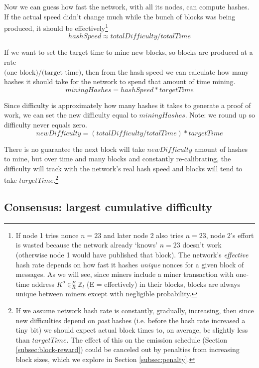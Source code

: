 Now we can guess how fast the network, with all its nodes, can compute hashes. If the actual speed didn't change much while the bunch of blocks was being produced, it should be effectively\footnote{If node 1 tries nonce $n = 23$ and later node 2 also tries $n = 23$, node 2's effort is wasted because the network already `knows' $n = 23$ doesn't work (otherwise node 1 would have published that block). The network's {\em effective} hash rate depends on how fast it hashes {\em unique} nonces for a given block of messages. As we will see, since miners include a miner transaction with one-time address $K^o \in^E_R \mathbb{Z}_l$ (E = effectively) in their blocks, blocks are always unique between miners except with negligible probability.}
\[ \mathit{hashSpeed} \approx \mathit{totalDifficulty}/\mathit{totalTime} \]

If we want to set the target time to mine new blocks, so blocks are produced at a rate\\ \(\textrm{(one block)/(target time)}\), then from the hash speed we can calculate how many hashes it should take for the network to spend that amount of time mining.
\[ \mathit{miningHashes} = \mathit{hashSpeed}*\mathit{targetTime} \]

Since difficulty is approximately how many hashes it takes to generate a proof of work, we can set the new difficulty equal to $\mathit{miningHashes}$. Note: we round up so difficulty never equals zero.
\[ \mathit{newDifficulty} = (\mathit{totalDifficulty}/\mathit{totalTime})*\mathit{targetTime}\]

There is no guarantee the next block will take $\mathit{newDifficulty}$ amount of hashes to mine, but over time and many blocks and constantly re-calibrating, the difficulty will track with the network's real hash speed and blocks will tend to take $\mathit{targetTime}$.\footnote{If we assume network hash rate is constantly, gradually, increasing, then since new difficulties depend on {\em past} hashes (i.e. before the hash rate increased a tiny bit) we should expect actual block times to, on average, be slightly less than $\mathit{targetTime}$. The effect of this on the emission schedule (Section \ref{subsec:block-reward}) could be canceled out by penalties from increasing block sizes, which we explore in Section \ref{subsec:penalty}.}


\subsection{Consensus: largest cumulative difficulty}

